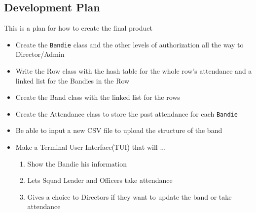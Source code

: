 \documentclass{article}
\begin{document}
\subsection{Development Plan}
This is a plan for how to create the final product
\begin{itemize}
	\item Create the \verb|Bandie| class and the other levels of authorization all the way to Director/Admin
	\item Write the Row class with the hash table for the whole row’s attendance and a linked list for the Bandies in the Row
	\item Create the Band class with the linked list for the rows
	\item Create the Attendance class to store the past  attendance for each \verb|Bandie|
	\item Be able to input a new CSV file to upload the structure of the band
	\item Make a Terminal User Interface(TUI) that will ...
		\begin{enumerate}
			\item Show the Bandie his information
			\item Lets Squad Leader and Officers take attendance
			\item Gives a choice to Directors if they want to update the band or take attendance
		\end{enumerate}
\end{itemize}
\end{document}
